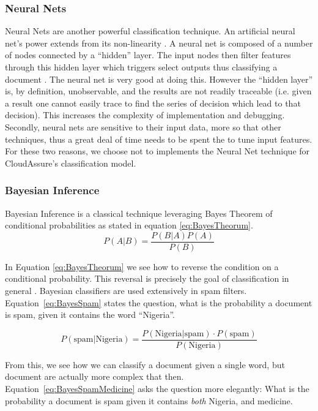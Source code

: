 \subsubsection{Neural Nets}
Neural Nets are another powerful classification technique. An artificial neural
net's power
extends from its non-linearity \autocite{Zhang2000}. A neural net is composed of
a number of nodes connected by a ``hidden'' layer. The input nodes
then filter features through this hidden layer which triggers select outputs
thus classifying a document \autocite{Merkl}. The neural net is very good at
doing this. However the ``hidden layer'' is, by definition, unobservable, and
the results are not readily traceable (i.e. given a result one cannot easily trace to
find the series of decision which lead to that decision). This increases the
complexity of implementation and debugging. Secondly, neural nets are sensitive
to their input data, more so that other techniques, thus a great deal of time
needs to be spent the to tune input features. For these two reasons, we choose not
to implements the Neural Net technique for CloudAssure's classification model.

\subsubsection{Bayesian Inference}
Bayesian Inference is a classical technique leveraging Bayes Theorem of
conditional probabilities as stated in equation \ref{eq:BayesTheorum}.
\begin{equation}
    P(A|B) = \frac{P(B | A) P(A)}{P(B)}
    \label{eq:BayesTheorum}
\end{equation}

In Equation \ref{eq:BayesTheorum} we see how to reverse the condition on
a conditional probability.  This reversal is precisely the goal of
classification in general \autocite{Bishop2009}. Bayesian classifiers are used
extensively in spam filters. Equation~\ref{eq:BayesSpam} states the
question, what is the probability a document is spam, given it contains the word
``Nigeria''. 

\begin{equation}
    P(\text{spam} | \text{Nigeria}) = \frac{P(\text{Nigeria}
    | \text{spam}) \cdot P(\text{spam})}{P(\text{Nigeria})}
    \label{eq:BayesSpam}
\end{equation}

From this, we see how we can classify a document given a single word, but
document are actually more complex that then.
Equation~\ref{eq:BayesSpamMedicine} asks the question more elegantly: What is
the probability a document is spam given it contains \emph{both} Nigeria, and
medicine. 

